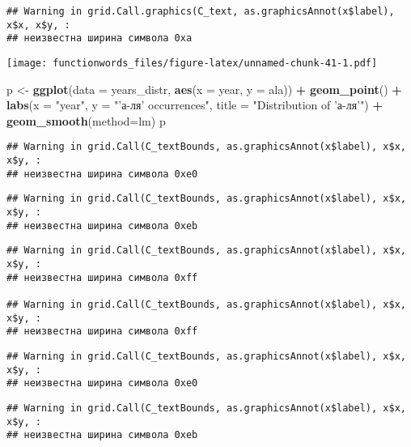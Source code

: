 \documentclass[
]{article}
\newenvironment{Shaded}{\begin{snugshade}}{\end{snugshade}}
\newcommand{\DataTypeTok}[1]{\textcolor[rgb]{0.13,0.29,0.53}{#1}}
\newcommand{\KeywordTok}[1]{\textcolor[rgb]{0.13,0.29,0.53}{\textbf{#1}}}
\newcommand{\NormalTok}[1]{#1}
\newcommand{\OperatorTok}[1]{\textcolor[rgb]{0.81,0.36,0.00}{\textbf{#1}}}
\newcommand{\StringTok}[1]{\textcolor[rgb]{0.31,0.60,0.02}{#1}}
\begin{document}
\begin{verbatim}
## Warning in grid.Call.graphics(C_text, as.graphicsAnnot(x$label), x$x, x$y, :
## неизвестна ширина символа 0xa
\end{verbatim}

\texttt{[image: functionwords\_files/figure-latex/unnamed-chunk-41-1.pdf]}

\begin{Shaded}
\begin{Highlighting}[]
\NormalTok{p <-}\StringTok{ }\KeywordTok{ggplot}\NormalTok{(}\DataTypeTok{data =}\NormalTok{ years_distr, }\KeywordTok{aes}\NormalTok{(}\DataTypeTok{x =}\NormalTok{ year, }\DataTypeTok{y =}\NormalTok{ ala)) }\OperatorTok{+}\StringTok{ }
\StringTok{  }\KeywordTok{geom_point}\NormalTok{() }\OperatorTok{+}
\StringTok{  }\KeywordTok{labs}\NormalTok{(}\DataTypeTok{x =} \StringTok{"year"}\NormalTok{,}
       \DataTypeTok{y =} \StringTok{"'а-ля' occurrences"}\NormalTok{,}
       \DataTypeTok{title =} \StringTok{"Distribution of 'а-ля'"}\NormalTok{) }\OperatorTok{+}
\StringTok{  }\KeywordTok{geom_smooth}\NormalTok{(}\DataTypeTok{method=}\NormalTok{lm)}
\NormalTok{p}
\end{Highlighting}
\end{Shaded}

\begin{verbatim}
## Warning in grid.Call(C_textBounds, as.graphicsAnnot(x$label), x$x, x$y, :
## неизвестна ширина символа 0xe0
\end{verbatim}

\begin{verbatim}
## Warning in grid.Call(C_textBounds, as.graphicsAnnot(x$label), x$x, x$y, :
## неизвестна ширина символа 0xeb
\end{verbatim}

\begin{verbatim}
## Warning in grid.Call(C_textBounds, as.graphicsAnnot(x$label), x$x, x$y, :
## неизвестна ширина символа 0xff

## Warning in grid.Call(C_textBounds, as.graphicsAnnot(x$label), x$x, x$y, :
## неизвестна ширина символа 0xff
\end{verbatim}

\begin{verbatim}
## Warning in grid.Call(C_textBounds, as.graphicsAnnot(x$label), x$x, x$y, :
## неизвестна ширина символа 0xe0
\end{verbatim}

\begin{verbatim}
## Warning in grid.Call(C_textBounds, as.graphicsAnnot(x$label), x$x, x$y, :
## неизвестна ширина символа 0xeb
\end{verbatim}
\end{document}
